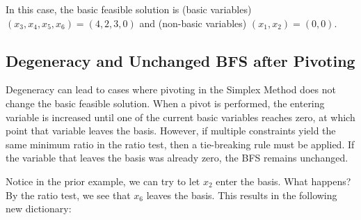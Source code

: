 In this case, the basic feasible solution is (basic variables) $(x_3,x_4, x_5,x_6) = (4,2,3,0)$ and (non-basic variables) $(x_1, x_2) = (0,0)$.

\subsection{Degeneracy and Unchanged BFS after Pivoting}
Degeneracy can lead to cases where pivoting in the Simplex Method does not change the basic feasible solution. When a pivot is performed, the entering variable is increased until one of the current basic variables reaches zero, at which point that variable leaves the basis. However, if multiple constraints yield the same minimum ratio in the ratio test, then a tie-breaking rule must be applied. If the variable that leaves the basis was already zero, the BFS remains unchanged. 

Notice in the prior example, we can try to let $x_2$ enter the basis.  What happens?  By the ratio test, we see that $x_6$ leaves the basis.  This results in the following new dictionary:

